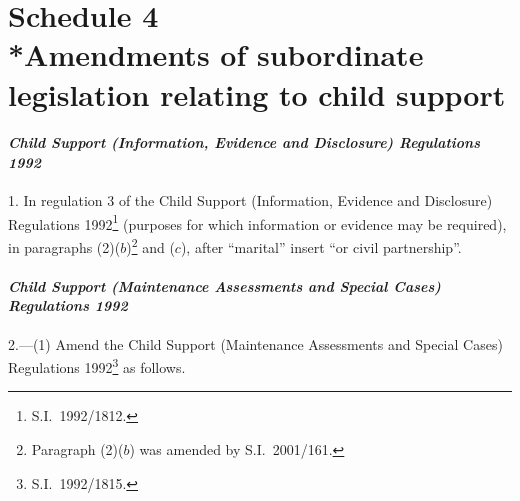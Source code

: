 \documentclass[12pt,a4paper]{article}
\begin{document}
\vfill

\part[Schedule 4 --- Amendments of subordinate legislation relating to child support]{Schedule 4\\*Amendments of subordinate legislation relating to child support}

\renewcommand\parthead{--- Schedule 4}

\subsection*{\itshape Child Support (Information, Evidence and Disclosure) Regulations 1992}

1.  In regulation 3 of the Child Support (Information, Evidence and Disclosure) Regulations 1992\footnote{S.I.\ 1992/1812.} (purposes for which information or evidence may be required), in paragraphs (2)($b$)\footnote{Paragraph (2)($b$) was amended by S.I.\ 2001/161.} and ($c$), after “marital” insert “or civil partnership”.

\subsection*{\itshape Child Support (Maintenance Assessments and Special Cases) Regulations 1992}

2.---(1)  Amend the Child Support (Maintenance Assessments and Special Cases) Regulations 1992\footnote{S.I.\ 1992/1815.} as follows.
\end{document}
